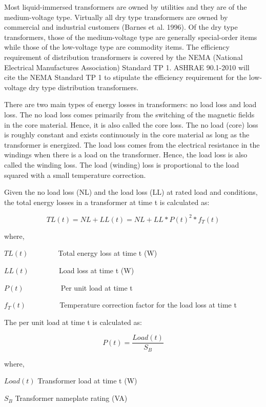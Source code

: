 Most liquid-immersed transformers are owned by utilities and they are of the medium-voltage type. Virtually all dry type transformers are owned by commercial and industrial customers (Barnes et al. 1996). Of the dry type transformers, those of the medium-voltage type are generally special-order items while those of the low-voltage type are commodity items. The efficiency requirement of distribution transformers is covered by the NEMA (National Electrical Manufactures Association) Standard TP 1. ASHRAE 90.1-2010 will cite the NEMA Standard TP 1 to stipulate the efficiency requirement for the low-voltage dry type distribution transformers.

There are two main types of energy losses in transformers: no load loss and load loss. The no load loss comes primarily from the switching of the magnetic fields in the core material. Hence, it is also called the core loss. The no load (core) loss is roughly constant and exists continuously in the core material as long as the transformer is energized. The load loss comes from the electrical resistance in the windings when there is a load on the transformer. Hence, the load loss is also called the winding loss. The load (winding) loss is proportional to the load squared with a small temperature correction.

Given the no load loss (NL) and the load loss (LL) at rated load and conditions, the total energy losses in a transformer at time t is calculated as:

\begin{equation}
TL(t) = NL + LL(t) = NL + LL*P{(t)^2}*{f_T}(t)
\end{equation}

where,

\(TL(t)\) ~~~~~~~ Total energy loss at time t (W)

\(LL(t)\) ~~~~~~~ Load loss at time t (W)

\(P(t)\) ~~~~~~~~~ Per unit load at time t

\({f_T}(t)\) ~~~~~~~~ Temperature correction factor for the load loss at time t

The per unit load at time t is calculated as:

\begin{equation}
P(t) = \frac{{Load(t)}}{{{S_B}}}
\end{equation}

where,

\(Load(t)\) Transformer load at time t (W)

\({S_B}\) Transformer nameplate rating (VA)

